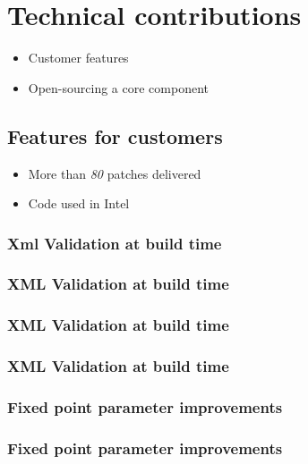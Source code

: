 %
%

\section{Technical contributions}
\begin{FrameWithSubSection}
    \begin{itemize}
        \item Customer features
        \item Open-sourcing a core component
    \end{itemize}
\end{FrameWithSubSection}


\subsection{Features for customers}
\begin{FrameWithSubSection}
    \begin{itemize}
        \item More than \emph{80} patches delivered
        \item Code used in Intel
    \end{itemize}
\end{FrameWithSubSection}

\subsubsection{Xml Validation at build time}
\begin{frame}
    \frametitle{XML Validation at build time}
\end{frame}

\begin{frame}
    \frametitle{XML Validation at build time}
\end{frame}

\begin{frame}
    \frametitle{XML Validation at build time}
\end{frame}

\subsubsection{Fixed point parameter improvements}
\begin{frame}
    \frametitle{Fixed point parameter improvements}
\end{frame}

